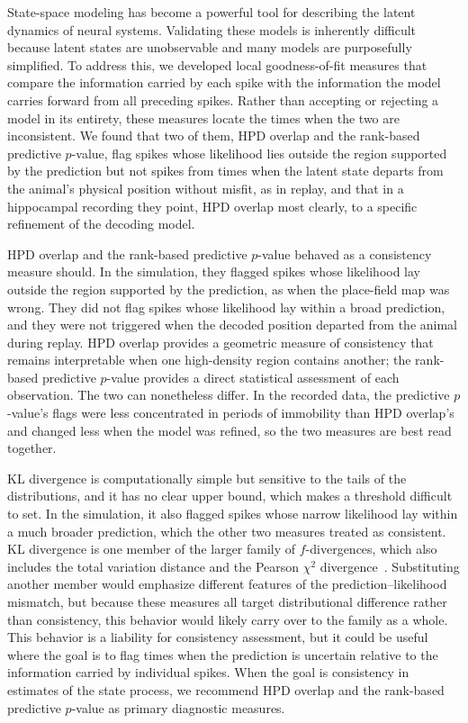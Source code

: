 \documentclass[12pt]{article}
\begin{document}
State-space modeling has become a powerful tool for describing the latent dynamics of neural systems. Validating these models is inherently difficult because latent states are unobservable and many models are purposefully simplified. To address this, we developed local goodness-of-fit measures that compare the information carried by each spike with the information the model carries forward from all preceding spikes. Rather than accepting or rejecting a model in its entirety, these measures locate the times when the two are inconsistent. We found that two of them, HPD overlap and the rank-based predictive $p$-value, flag spikes whose likelihood lies outside the region supported by the prediction but not spikes from times when the latent state departs from the animal's physical position without misfit, as in replay, and that in a hippocampal recording they point, HPD overlap most clearly, to a specific refinement of the decoding model.

HPD overlap and the rank-based predictive $p$-value behaved as a consistency measure should. In the simulation, they flagged spikes whose likelihood lay outside the region supported by the prediction, as when the place-field map was wrong. They did not flag spikes whose likelihood lay within a broad prediction, and they were not triggered when the decoded position departed from the animal during replay. HPD overlap provides a geometric measure of consistency that remains interpretable when one high-density region contains another; the rank-based predictive $p$-value provides a direct statistical assessment of each observation. The two can nonetheless differ. In the recorded data, the predictive $p$-value's flags were less concentrated in periods of immobility than HPD overlap's and changed less when the model was refined, so the two measures are best read together.

KL divergence is computationally simple but sensitive to the tails of the distributions, and it has no clear upper bound, which makes a threshold difficult to set. In the simulation, it also flagged spikes whose narrow likelihood lay within a much broader prediction, which the other two measures treated as consistent. KL divergence is one member of the larger family of $f$-divergences, which also includes the total variation distance and the Pearson $\chi^2$ divergence~\cite{pearsonCriterionThatGiven1900}. Substituting another member would emphasize different features of the prediction--likelihood mismatch, but because these measures all target distributional difference rather than consistency, this behavior would likely carry over to the family as a whole. This behavior is a liability for consistency assessment, but it could be useful where the goal is to flag times when the prediction is uncertain relative to the information carried by individual spikes. When the goal is consistency in estimates of the state process, we recommend HPD overlap and the rank-based predictive $p$-value as primary diagnostic measures.
\end{document}
